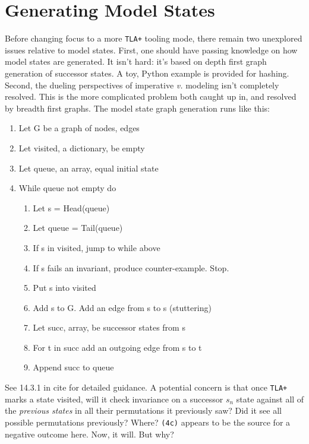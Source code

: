\documentclass[twocolumn]{article}
\begin{document}
\section{Generating Model States}
Before changing focus to a more \texttt{TLA+} tooling mode, there remain two unexplored issues relative to model states. First, one should have passing knowledge on how model states are generated. It isn't hard: it's based on depth first graph generation of successor states. A toy, Python example is provided for hashing. Second, the dueling perspectives of imperative \emph{v.} modeling isn't completely resolved. This is the more complicated problem both caught up in, and resolved by breadth first graphs. The model state graph generation runs like this:

\begin{enumerate}
\item Let G be a graph of nodes, edges
\item Let visited, a dictionary, be empty
\item Let queue, an array, equal initial state
\item While queue not empty do
	\begin{enumerate}
	\item Let s = Head(queue)
	\item Let queue = Tail(queue)
	\item If s in visited, jump to while above
	\item If s fails an invariant, produce counter-example. Stop.
	\item Put s into visited
	\item Add s to G. Add an edge from s to s (stuttering)
	\item Let succ, array, be successor states from s
	\item For t in succ add an outgoing edge from s to t
	\item Append succ to queue
	\end{enumerate}
\end{enumerate}

\noindent See 14.3.1 in cite for detailed guidance. A potential concern is that once \texttt{TLA+} marks a state visited, will it check invariance on a successor $s_n$ state against all of the \emph{previous states} in all their permutations it previously saw? Did it see all possible permutations previously? Where? \texttt{(4c)} appears to be the source for a negative outcome here. Now, it will. But why?
\end{document}
